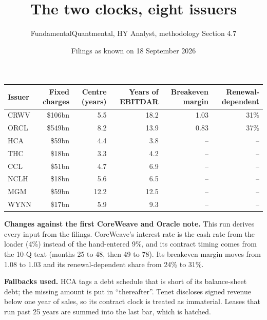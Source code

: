 \documentclass[11pt,a4paper]{article}
\title{The two clocks, eight issuers}
\author{FundamentalQuantmental, HY Analyst, methodology Section 4.7}
\date{Filings as known on 18 September 2026}
\begin{document}
\maketitle
\noindent{}

\begin{center}\small
\begin{tabular}{@{}lrrrrr@{}}\toprule
Issuer & Fixed charges & Centre (years) & Years of EBITDAR & Breakeven margin & Renewal-dependent \\\midrule
CRWV & \$106bn & 5.5 & 18.2 & 1.03 & 31\% \\
ORCL & \$549bn & 8.2 & 13.9 & 0.83 & 37\% \\
HCA & \$59bn & 4.4 & 3.8 & -- & -- \\
THC & \$18bn & 3.3 & 4.2 & -- & -- \\
CCL & \$51bn & 4.7 & 6.9 & -- & -- \\
NCLH & \$18bn & 5.6 & 6.5 & -- & -- \\
MGM & \$59bn & 12.2 & 12.5 & -- & -- \\
WYNN & \$17bn & 5.9 & 9.3 & -- & -- \\
\bottomrule
\end{tabular}
\end{center}

\textbf{Changes against the first CoreWeave and Oracle note.} This run derives every input from the filings. CoreWeave's interest rate is the cash rate from the loader (4\%) instead of the hand-entered 9\%, and its contract timing comes from the 10-Q text (months 25 to 48, then 49 to 78). Its breakeven margin moves from 1.08 to 1.03 and its renewal-dependent share from 24\% to 31\%.

\textbf{Fallbacks used.} HCA tags a debt schedule that is short of its balance-sheet debt; the missing amount is put in ``thereafter''. Tenet discloses signed revenue below one year of sales, so its contract clock is treated as immaterial. Leases that run past 25 years are summed into the last bar, which is hatched.
\newpage
\end{document}
